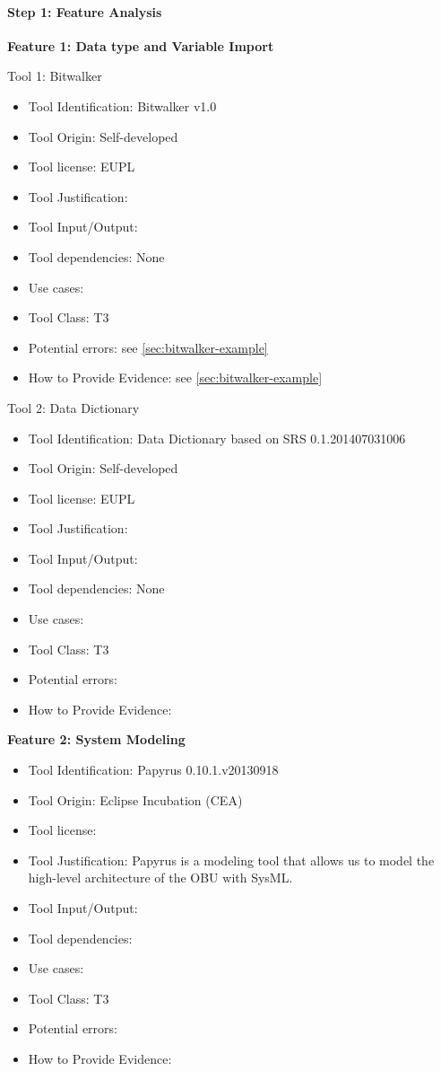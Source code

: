 \paragraph{Step 1: Feature Analysis}
{\bf Feature 1: Data type and Variable Import}\\
\begin{description}
\item Tool 1: Bitwalker 
  \begin{itemize}
  \item Tool Identification: Bitwalker v1.0
  \item Tool Origin: Self-developed
  \item Tool license: EUPL
  \item Tool Justification: 
  \item Tool Input/Output: 
  \item Tool dependencies: None
  \item Use cases:
  \item Tool Class: T3
  \item Potential errors: see \ref{sec:bitwalker-example}
  \item How to Provide Evidence: see \ref{sec:bitwalker-example}
   \end{itemize}
\item Tool 2: Data Dictionary
\begin{itemize}
  \item Tool Identification: Data Dictionary  based on SRS 0.1.201407031006
  \item Tool Origin: Self-developed
  \item Tool license: EUPL
  \item Tool Justification: 
  \item Tool Input/Output: 
  \item Tool dependencies: None
  \item Use cases:
  \item Tool Class: T3
  \item Potential errors: 
  \item How to Provide Evidence:
   \end{itemize}
\end{description}

{\bf Feature 2: System Modeling}\\
  \begin{itemize}
  \item Tool Identification: Papyrus  0.10.1.v20130918
  \item Tool Origin: Eclipse Incubation (CEA)
  \item Tool license:  
  \item Tool Justification: Papyrus is a modeling tool that allows us
    to model the high-level architecture of the OBU with SysML.
  \item Tool Input/Output: 
  \item Tool dependencies: 
  \item Use cases:
  \item Tool Class: T3
  \item Potential errors:
  \item How to Provide Evidence:                 
  \end{itemize}

